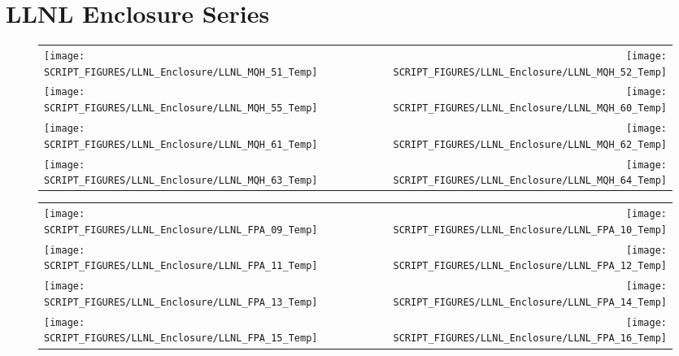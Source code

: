 \clearpage

\section{LLNL Enclosure Series}

\begin{figure}[!ht]
\begin{tabular*}{\textwidth}{l@{\extracolsep{\fill}}r}
\texttt{[image: SCRIPT\_FIGURES/LLNL\_Enclosure/LLNL\_MQH\_51\_Temp]} &
\texttt{[image: SCRIPT\_FIGURES/LLNL\_Enclosure/LLNL\_MQH\_52\_Temp]} \\
\texttt{[image: SCRIPT\_FIGURES/LLNL\_Enclosure/LLNL\_MQH\_55\_Temp]} &
\texttt{[image: SCRIPT\_FIGURES/LLNL\_Enclosure/LLNL\_MQH\_60\_Temp]} \\
\texttt{[image: SCRIPT\_FIGURES/LLNL\_Enclosure/LLNL\_MQH\_61\_Temp]} &
\texttt{[image: SCRIPT\_FIGURES/LLNL\_Enclosure/LLNL\_MQH\_62\_Temp]} \\
\texttt{[image: SCRIPT\_FIGURES/LLNL\_Enclosure/LLNL\_MQH\_63\_Temp]} &
\texttt{[image: SCRIPT\_FIGURES/LLNL\_Enclosure/LLNL\_MQH\_64\_Temp]}
\end{tabular*}
\end{figure}

\begin{figure}[!ht]
\begin{tabular*}{\textwidth}{l@{\extracolsep{\fill}}r}
\texttt{[image: SCRIPT\_FIGURES/LLNL\_Enclosure/LLNL\_FPA\_09\_Temp]} &
\texttt{[image: SCRIPT\_FIGURES/LLNL\_Enclosure/LLNL\_FPA\_10\_Temp]} \\
\texttt{[image: SCRIPT\_FIGURES/LLNL\_Enclosure/LLNL\_FPA\_11\_Temp]} &
\texttt{[image: SCRIPT\_FIGURES/LLNL\_Enclosure/LLNL\_FPA\_12\_Temp]} \\
\texttt{[image: SCRIPT\_FIGURES/LLNL\_Enclosure/LLNL\_FPA\_13\_Temp]} &
\texttt{[image: SCRIPT\_FIGURES/LLNL\_Enclosure/LLNL\_FPA\_14\_Temp]} \\
\texttt{[image: SCRIPT\_FIGURES/LLNL\_Enclosure/LLNL\_FPA\_15\_Temp]} &
\texttt{[image: SCRIPT\_FIGURES/LLNL\_Enclosure/LLNL\_FPA\_16\_Temp]}
\end{tabular*}
\end{figure}

